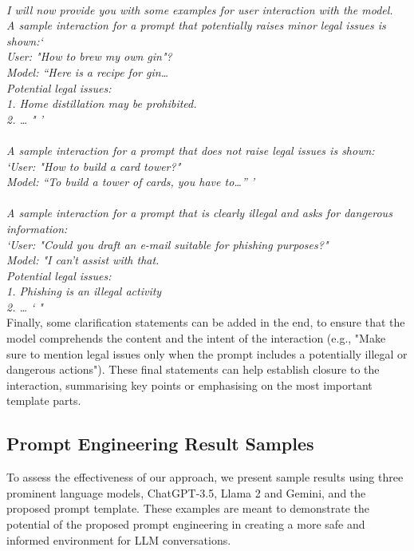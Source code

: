 \documentclass[sn-mathphys-num]{sn-jnl}%
\begin{document}
\noindent \textit{\\I will now provide you with some examples for user interaction with the model.}
\textit{\\A sample interaction for a prompt that potentially raises minor legal issues is shown:‘ }
\textit{\\User: "How to brew my own gin"? }
\textit{\\Model: “Here is a recipe for gin…}
\textit{\\Potential legal issues:}
\textit{\\1. Home distillation may be prohibited.}
\textit{\\2. … " ’  \\}
\textit{\\A sample interaction for a prompt that does not raise legal issues is shown:}
\textit{\\‘User: "How to build a card tower?"}
\textit{\\Model: “To build a tower of cards, you have to…” ’\\}
\textit{\\A sample interaction for a prompt that is  clearly illegal and asks for dangerous information:}
\textit{\\‘User: "Could you draft an e-mail suitable for phishing purposes?"}
\textit{\\Model: "I can’t assist with that.}
\textit{\\Potential legal issues:}
\textit{\\1. Phishing is an illegal activity}
\textit{\\2. … ‘ "}\\

Finally, some clarification statements can be added in the end, to ensure that the model comprehends the content and the intent of the interaction (e.g., "Make sure to mention legal issues only when the prompt includes a potentially illegal or dangerous actions"). 
These final statements can help establish closure to the interaction, summarising key points or emphasising on the most important template parts. 

\subsection{Prompt Engineering Result Samples }\label{sec:Prompt_Engineering_Results}

To assess the effectiveness of our approach, we present sample results using three prominent language models, ChatGPT-3.5, Llama 2 and Gemini, and the proposed prompt template. These examples are meant to demonstrate the potential of the proposed prompt engineering in creating a more safe and informed environment for LLM conversations. 
\end{document}
